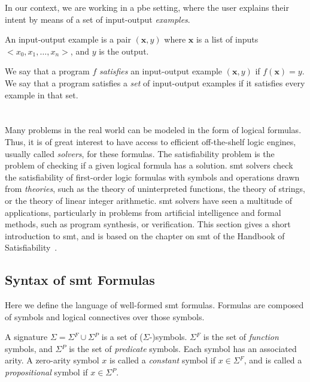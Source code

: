 In our context, we are working in a \gls{pbe} setting, where the user explains
their intent by means of a set of input-output \textit{examples}.

\begin{definition}
  An input-output example is a pair $(\mathbf{x}, y)$ where $\mathbf{x}$ is a
  list of inputs $<x_0, x_1, \ldots, x_n>$, and $y$ is the output.
\end{definition}

We say that a program $f$ \textit{satisfies} an input-output example
$(\mathbf{x}, y)$ if $f(\mathbf{x}) = y$.
We say that a program satisfies a \textit{set} of input-output examples if it
satisfies every example in that set.

\section{}
\label{sec:smt}

Many problems in the real world can be modeled in the form of logical formulas.
Thus, it is of great interest to have access to efficient off-the-shelf
logic engines, usually called \textit{solvers}, for these formulas.
The satisfiability problem is the problem of checking if a given logical formula
has a solution.
\gls{smt} solvers check the satisfiability of first-order logic formulas with
symbols and operations drawn from \textit{theories}, such as the theory of
uninterpreted functions, the theory of strings, or the theory of linear integer
arithmetic.
\gls{smt} solvers have seen a multitude of applications, particularly in
problems from artificial intelligence and formal methods, such as program
synthesis, or verification.
This section gives a short introduction to \gls{smt}, and is based on the
chapter on \gls{smt} of the Handbook of Satisfiability~\cite{Biere:2009:HSV}.

\subsection{Syntax of \gls{smt} Formulas}
\label{sec:smt-syntax}

Here we define the language of well-formed \gls{smt} formulas. Formulas are
composed of symbols and logical connectives over those symbols.

\begin{definition}[Signature]
  A signature $\Sigma{} = \Sigma{}^F \cup{} \Sigma{}^P$ is a set of
  ($\Sigma{}$-)symbols.
  $\Sigma{}^F$ is the set of \textit{function} symbols, and $\Sigma{}^P$ is the
  set of \textit{predicate} symbols.
  Each symbol has an associated arity. A zero-arity symbol $x$ is called a
  \textit{constant} symbol if $x \in \Sigma{}^F$, and is called a
  \textit{propositional} symbol if $x \in \Sigma{}^P$.
\end{definition}

